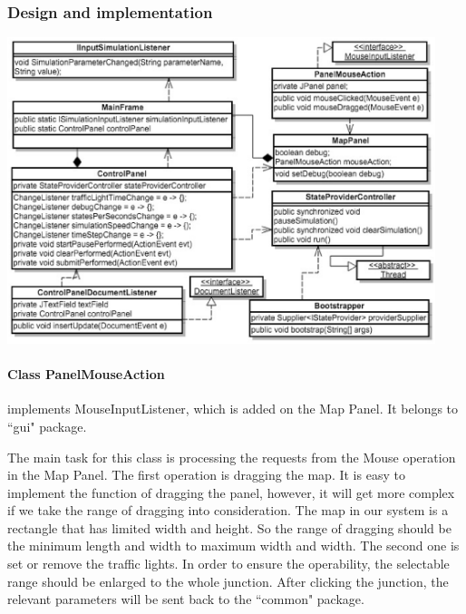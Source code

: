 \documentclass[a4paper,12pt]{article}
\begin{document}
\subsubsection{Design and implementation}
\includegraphics[width=12.5cm]{interactionClassGraph.eps}
\paragraph{Class PanelMouseAction} implements MouseInputListener, which is added on the Map Panel. It belongs to ``gui" package. 

The main task for this class is processing the requests from the Mouse operation in the Map Panel. The first operation is dragging the map. It is easy to implement the function of dragging the panel, however, it will get more complex if we take the range of dragging into consideration. The map in our system is a rectangle that has limited width and height. So the range of dragging should be the minimum length and width to maximum width and width. The second one is set or remove the traffic lights. In order to ensure the operability, the selectable range should be enlarged to the whole junction. After clicking the junction, the relevant parameters will be sent back to the ``common" package.
\end{document}
